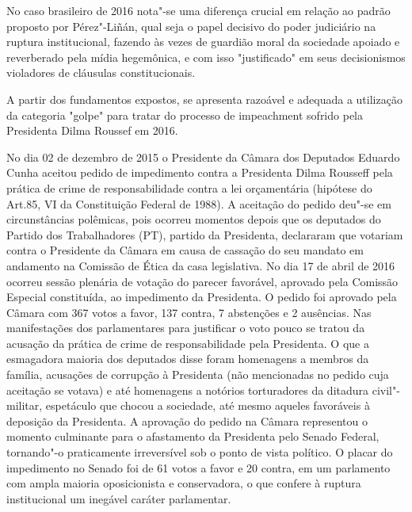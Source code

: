 No caso brasileiro de 2016 nota"-se uma diferença crucial em relação ao
padrão proposto por Pérez"-Liñán, qual seja o papel decisivo do poder
judiciário na ruptura institucional, fazendo às vezes de guardião moral
da sociedade apoiado e reverberado pela mídia hegemônica, e com isso
"justificado" em seus decisionismos violadores de cláusulas
constitucionais.

A partir dos fundamentos expostos, se apresenta razoável e adequada a
utilização da categoria "golpe" para tratar do processo de impeachment
sofrido pela Presidenta Dilma Roussef em 2016.

No dia 02 de dezembro de 2015 o Presidente da Câmara dos Deputados
Eduardo Cunha aceitou pedido de impedimento contra a Presidenta Dilma
Rousseff pela prática de crime de responsabilidade contra a lei
orçamentária (hipótese do Art.85, VI da Constituição Federal de 1988). A
aceitação do pedido deu"-se em circunstâncias polêmicas, pois ocorreu
momentos depois que os deputados do Partido dos Trabalhadores (PT),
partido da Presidenta, declararam que votariam contra o Presidente da
Câmara em causa de cassação do seu mandato em andamento na Comissão de
Ética da casa legislativa. No dia 17 de abril de 2016 ocorreu sessão
plenária de votação do parecer favorável, aprovado pela Comissão
Especial constituída, ao impedimento da Presidenta. O pedido foi
aprovado pela Câmara com 367 votos a favor, 137 contra, 7 abstenções e 2
ausências. Nas manifestações dos parlamentares para justificar o voto
pouco se tratou da acusação da prática de crime de responsabilidade pela
Presidenta. O que a esmagadora maioria dos deputados disse foram
homenagens a membros da família, acusações de corrupção à Presidenta
(não mencionadas no pedido cuja aceitação se votava) e até homenagens a
notórios torturadores da ditadura civil"-militar, espetáculo que chocou a
sociedade, até mesmo aqueles favoráveis à deposição da Presidenta. A
aprovação do pedido na Câmara representou o momento culminante para o
afastamento da Presidenta pelo Senado Federal, tornando"-o praticamente
irreversível sob o ponto de vista político. O placar do impedimento no
Senado foi de 61 votos a favor e 20 contra, em um parlamento com ampla
maioria oposicionista e conservadora, o que confere à ruptura
institucional um inegável caráter parlamentar.


